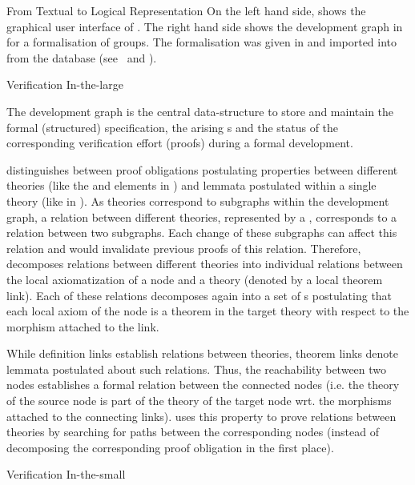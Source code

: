 \begin{omgroup}[id=maya,short=\maya,creators={autexier,hutter,mossakowski,shairer}]
\begin{omgroup}{From Textual to Logical Representation}
On the left hand side, {} shows the graphical user interface of
{\maya}. The right hand side shows the development graph in {\maya} for a formalisation of
groups. The formalisation was given in {\omdoc} and imported into {\maya} from the
{\omdoc} database {\mbase} (see~\cite{KohFra:rkcimss01} and {}).
\end{omgroup}

\begin{omgroup}{Verification In-the-large}

The development graph is the central data-structure to store and maintain the formal
(structured) specification, the arising {s} and the status of
the corresponding verification effort (proofs) during a formal development.

{\maya} distinguishes between proof obligations postulating properties between different
theories (like the {} and {} elements
in {\omdoc}) and lemmata postulated within a single theory (like {} in
{\omdoc}).  As theories correspond to subgraphs within the development graph, a relation
between different theories, represented by a {},
corresponds to a relation between two subgraphs.  Each change of these subgraphs can
affect this relation and would invalidate previous proofs of this relation. Therefore,
{\maya} decomposes relations between different theories into individual relations between
the local axiomatization of a node and a theory (denoted by a local theorem link). Each of
these relations decomposes again into a set of {s} postulating
that each local axiom of the node is a theorem in the target theory with respect to the
morphism attached to the link.

While definition links establish relations between theories, theorem links denote
lemmata postulated about such relations. Thus, the reachability between two nodes
establishes a formal relation between the connected nodes (i.e. the theory of the
source node is part of the theory of the target node wrt. the morphisms attached
to the connecting links). {\maya} uses this property to prove relations between
theories by searching for paths between the corresponding nodes (instead of
decomposing the corresponding proof obligation in the first place).
\end{omgroup}

\begin{omgroup}{Verification In-the-small}


\end{omgroup}
\end{omgroup}
